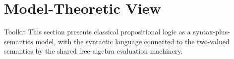 \section{Model-Theoretic View}

\begin{toolkitbox}{Toolkit}
This section presents classical propositional logic as a syntax-plus-semantics
model, with the syntactic language connected to the two-valued semantics by
the shared free-algebra evaluation machinery.
\end{toolkitbox}




